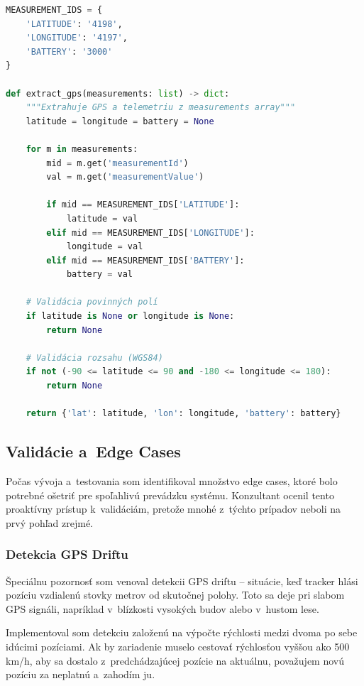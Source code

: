 \begin{lstlisting}[language=Python, label=src:parser, caption={Extrakcia GPS súradníc z~SenseCap payloadu}]
MEASUREMENT_IDS = {
    'LATITUDE': '4198',
    'LONGITUDE': '4197',
    'BATTERY': '3000'
}

def extract_gps(measurements: list) -> dict:
    """Extrahuje GPS a telemetriu z measurements array"""
    latitude = longitude = battery = None

    for m in measurements:
        mid = m.get('measurementId')
        val = m.get('measurementValue')

        if mid == MEASUREMENT_IDS['LATITUDE']:
            latitude = val
        elif mid == MEASUREMENT_IDS['LONGITUDE']:
            longitude = val
        elif mid == MEASUREMENT_IDS['BATTERY']:
            battery = val

    # Validácia povinných polí
    if latitude is None or longitude is None:
        return None

    # Validácia rozsahu (WGS84)
    if not (-90 <= latitude <= 90 and -180 <= longitude <= 180):
        return None

    return {'lat': latitude, 'lon': longitude, 'battery': battery}
\end{lstlisting}

\subsection{Validácie a~Edge Cases}
\label{sec:Validace}

Počas vývoja a~testovania som identifikoval množstvo edge cases, ktoré bolo potrebné ošetriť pre spoľahlivú prevádzku systému. Konzultant ocenil tento proaktívny prístup k~validáciám, pretože mnohé z~týchto prípadov neboli na prvý pohľad zrejmé.

\subsubsection{Detekcia GPS Driftu}

Špeciálnu pozornosť som venoval detekcii GPS driftu -- situácie, keď tracker hlási pozíciu vzdialenú stovky metrov od skutočnej polohy. Toto sa deje pri slabom GPS signáli, napríklad v~blízkosti vysokých budov alebo v~hustom lese.

Implementoval som detekciu založenú na výpočte rýchlosti medzi dvoma po sebe idúcimi pozíciami. Ak by zariadenie muselo cestovať rýchlosťou vyššou ako 500 km/h, aby sa dostalo z~predchádzajúcej pozície na aktuálnu, považujem novú pozíciu za neplatnú a~zahodím ju.

